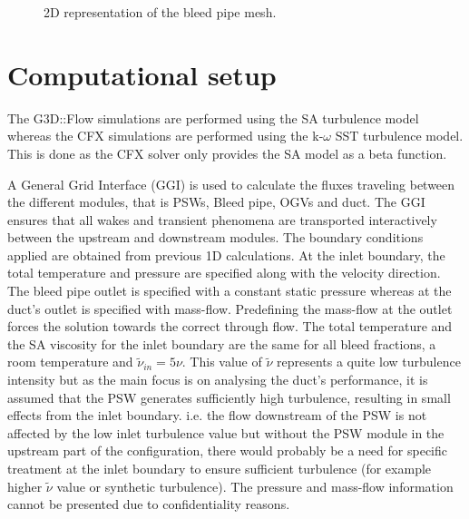 \begin{figure}[h!]
  \centering
\caption{2D representation of the bleed pipe mesh.}\label{fig:bleed}
\end{figure}


\section{Computational setup}
The G3D::Flow simulations are performed using the SA turbulence model whereas the CFX simulations are performed using the k-$\omega$ SST turbulence model. This is done as the CFX solver only provides the SA model as a beta function.

A General Grid Interface (GGI) is used to calculate the fluxes traveling between the different modules, that is PSWs, Bleed pipe, OGVs and duct. The GGI ensures that all wakes and transient phenomena are transported interactively between the upstream and downstream modules. The boundary conditions applied are obtained from previous 1D calculations. At the inlet boundary, the total temperature and pressure are specified along with the velocity direction. The bleed pipe outlet is specified with a constant static pressure whereas at the duct's outlet is specified with mass-flow. Predefining the mass-flow at the outlet forces the solution towards the correct through flow. The total temperature and the SA viscosity for the inlet boundary are the same for all bleed fractions, a room temperature and $\tilde{\nu}_{in}=5\nu$. This value of $\tilde{\nu}$ represents a quite low turbulence intensity but as the main focus is on analysing the duct’s performance, it is assumed that the PSW generates sufficiently high turbulence, resulting in small effects from the inlet boundary. i.e. the flow downstream of the PSW is not affected by the low inlet turbulence value but without the PSW module in the upstream part of the configuration, there would probably be a need for specific treatment at the inlet boundary to ensure sufficient turbulence (for example higher $\tilde{\nu}$ value or synthetic turbulence). The pressure and mass-flow information cannot be presented due to confidentiality reasons.


